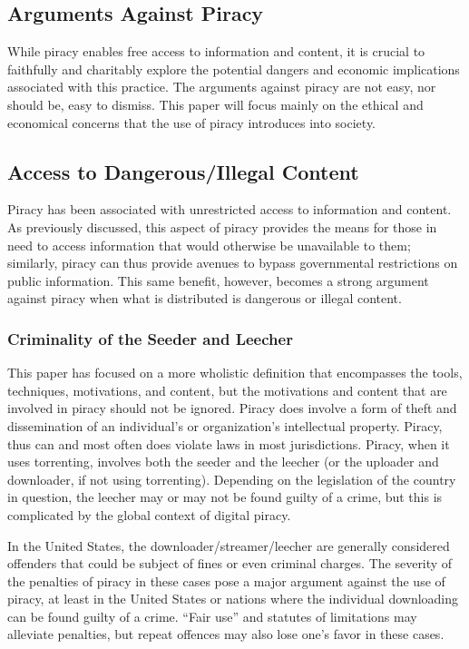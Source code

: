 \documentclass[onecolumn, 12pt]{article}
\begin{document}
\begin{refsection}
\section{Arguments Against Piracy}
While piracy enables free access to information and content, it is crucial to
faithfully and charitably explore the potential dangers and economic
implications associated with this practice. The arguments against piracy are
not easy, nor should be, easy to dismiss. This paper will focus mainly on the
ethical and economical concerns that the use of piracy introduces into society.

\subsection{Access to Dangerous/Illegal Content}
Piracy has been associated with unrestricted access to information and
content. As previously discussed, this aspect of piracy provides the means for
those in need to access information that would otherwise be unavailable to them;
similarly, piracy can thus provide avenues to bypass governmental restrictions
on public information. This same benefit, however, becomes a strong argument
against piracy when what is distributed is dangerous or illegal content.

\subsubsection{Criminality of the Seeder and Leecher}
This paper has focused on a more wholistic definition that encompasses
the tools, techniques, motivations, and content, but the motivations and
content that are involved in piracy should not be ignored. Piracy does involve
a form of theft and dissemination of an individual's or organization's
intellectual property. Piracy, thus can and most often does violate laws in
most jurisdictions. Piracy, when it uses torrenting, involves both the
seeder and the leecher (or the uploader and downloader, if not using torrenting).
Depending on the legislation of the country in question, the leecher may or
may not be found guilty of a crime, but this is complicated by the global
context of digital piracy.

In the United States, the downloader/streamer/leecher are generally considered
offenders that could be subject of fines or even criminal charges. The severity
of the penalties of piracy in these cases pose a major argument against the use
of piracy, at least in the United States or nations where the individual
downloading can be found guilty of a crime. ``Fair use'' and statutes of
limitations may alleviate penalties, but repeat offences may also lose one's
favor in these cases.~\cite{felonies.org}


\end{refsection}
\end{document}
